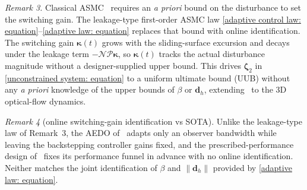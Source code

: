 \documentclass{IEEEtaes}
\begin{document}
\textit{Remark 3.} Classical ASMC~\cite{roy2020} requires an \emph{a priori} bound on the disturbance to set the switching gain. The leakage-type first-order ASMC law \eqref{adaptive control law: equation}--\eqref{adaptive law: equation} replaces that bound with online identification. The switching gain $\boldsymbol{\kappa}(t)$ grows with the sliding-surface excursion and decays under the leakage term $-\mathcal{N}\mathcal{P}\boldsymbol{\kappa}$, so $\boldsymbol{\kappa}(t)$ tracks the actual disturbance magnitude without a designer-supplied upper bound. This drives $\boldsymbol{\zeta}_2$ in \eqref{unconstrained system: equation} to a uniform ultimate bound (UUB) without any \emph{a priori} knowledge of the upper bounds of $\beta$ or $\boldsymbol{d}_h$, extending~\cite{singhal2025} to the 3D optical-flow dynamics.

\textit{Remark 4} (online switching-gain identification vs SOTA). Unlike the leakage-type law of Remark~3, the AEDO of~\cite{zhang2026} adapts only an observer bandwidth while leaving the backstepping controller gains fixed, and the prescribed-performance design of~\cite{lin2023} fixes its performance funnel in advance with no online identification. Neither matches the joint identification of $\beta$ and $\|\boldsymbol{d}_h\|$ provided by \eqref{adaptive law: equation}.
\end{document}
